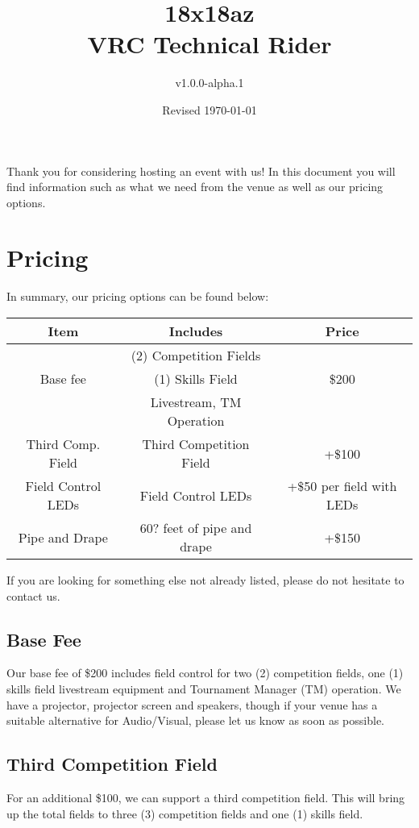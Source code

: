\documentclass[12pt]{article}
\title{18x18az\\VRC Technical Rider}
\author{v1.0.0-alpha.1}
\date{Revised \today}
\begin{document}
\maketitle
Thank you for considering hosting an event with us!
In this document you will find information such as what we need from the venue as well as our pricing options.
\tableofcontents
\pagebreak
\section{Pricing}

In summary, our pricing options can be found below:
\begin{center}
    \begin{tabular}{|c|c|c|}
        \hline
        \textbf{Item} & \textbf{Includes} & \textbf{Price} \\
        \hline
        & (2) Competition Fields &  \\
        Base fee & (1) Skills Field & \$200 \\
        & Livestream, TM Operation & \\
        \hline
        Third Comp. Field & Third Competition Field & +\$100 \\
        \hline
        Field Control LEDs & Field Control LEDs & +\$50 per field with LEDs \\
        \hline
        Pipe and Drape & 60? feet of pipe and drape & +\$150 \\
        \hline
    \end{tabular}
\end{center}
If you are looking for something else not already listed, please do not hesitate to contact us.

\subsection{Base Fee}
Our base fee of \$200 includes field control for two (2) competition fields, one (1) skills field livestream equipment and Tournament Manager (TM) operation.
We have a projector, projector screen and speakers, though if your venue has a suitable alternative for Audio/Visual, please let us know as soon as possible.

\subsection{Third Competition Field}
For an additional \$100, we can support a third competition field.
This will bring up the total fields to three (3) competition fields and one (1) skills field.
\end{document}
